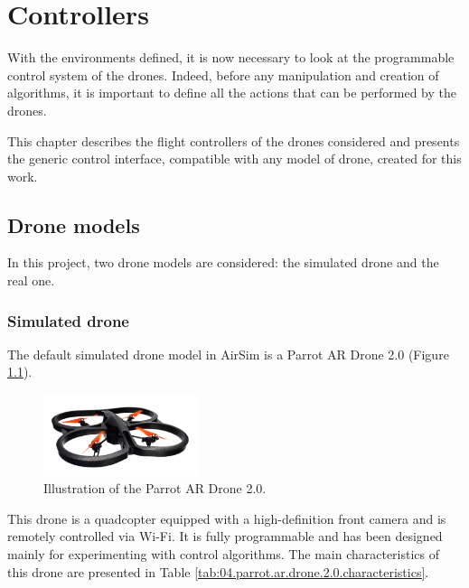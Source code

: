\chapter{Controllers}\label{ch:controllers}

With the environments defined, it is now necessary to look at the programmable control system of the drones. Indeed, before any manipulation and creation of algorithms, it is important to define all the actions that can be performed by the drones.

This chapter describes the flight controllers of the drones considered and presents the generic control interface, compatible with any model of drone, created for this work.

\section{Drone models}

In this project, two drone models are considered: the simulated drone and the real one.

\subsection{Simulated drone}

The default simulated drone model in AirSim is a Parrot AR Drone 2.0 \cite{wikipedia2021parrotardrone} (Figure \ref{fig:04.parrot.ar.drone.2.0.illustration}).

\begin{figure}[H]
    \centering
    \includegraphics[width=0.4\textwidth]{resources/png/04/parrot-ar-drone-2.0.png}
    \caption{Illustration of the Parrot AR Drone 2.0. \cite{freepng2021parrotardrone}}
    \label{fig:04.parrot.ar.drone.2.0.illustration}
\end{figure}

This drone is a quadcopter equipped with a high-definition front camera and is remotely controlled via Wi-Fi. It is fully programmable and has been designed mainly for experimenting with control algorithms. The main characteristics of this drone are presented in Table \ref{tab:04.parrot.ar.drone.2.0.characteristics}.

